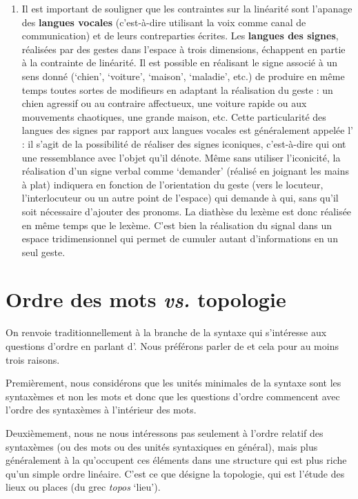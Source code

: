 {\begin{enumerate}
    \item Il est important de souligner que les contraintes sur la linéarité sont l’apanage des \textbf{langues vocales} (c’est-à-dire utilisant la voix comme canal de communication) et de leurs contreparties écrites. Les \textbf{langues des signes}, réalisées par des gestes dans l’espace à trois dimensions, échappent en partie à la contrainte de linéarité. Il est possible en réalisant le signe associé à un sens donné (‘chien’, ‘voiture’, ‘maison’, ‘maladie’, etc.) de produire en même temps toutes sortes de modifieurs en adaptant la réalisation du geste : un chien agressif ou au contraire affectueux, une voiture rapide ou aux mouvements chaotiques, une grande maison, etc. Cette particularité des langues des signes par rapport aux langues vocales est généralement appelée l’ : il s’agit de la possibilité de réaliser des signes iconiques, c’est-à-dire qui ont une ressemblance avec l’objet qu’il dénote. Même sans utiliser l’iconicité, la réalisation d’un signe verbal comme ‘demander’ (réalisé en joignant les mains à plat) indiquera en fonction de l’orientation du geste (vers le locuteur, l’interlocuteur ou un autre point de l’espace) qui demande à qui, sans qu’il soit nécessaire d’ajouter des pronoms. La diathèse du lexème est donc réalisée en même temps que le lexème. C’est bien la réalisation du signal dans un espace tridimensionnel qui permet de cumuler autant d’informations en un seul geste.
    \end{enumerate}
}
\section{Ordre des mots \textit{vs.} topologie}\label{sec:3.5.2}

On renvoie traditionnellement à la branche de la syntaxe qui s’intéresse aux questions d’ordre en parlant d’. Nous préférons parler de  et cela pour au moins trois raisons.

Premièrement, nous considérons que les unités minimales de la syntaxe sont les syntaxèmes et non les mots et donc que les questions d’ordre commencent avec l’ordre des syntaxèmes à l’intérieur des mots.

Deuxièmement, nous ne nous intéressons pas seulement à l’ordre relatif des syntaxèmes (ou des mots ou des unités syntaxiques en général), mais plus généralement à la  qu’occupent ces éléments dans une structure qui est plus riche qu’un simple ordre linéaire. C’est ce que désigne la topologie, qui est l’étude des lieux ou places (du grec \textit{topos} ‘lieu’).

